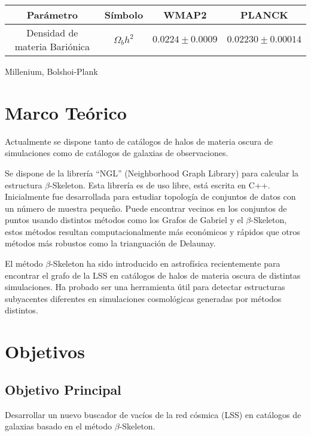 \documentclass[preprint]{aastex62}
\begin{document}
\begin{table}[htb]
    \begin{tabular}{|cc|cc| }
      \hline
      Parámetro & Símbolo & WMAP2 & PLANCK  \\
      \hline
      Densidad de materia Bariónica & $\Omega_b h^2$ & $0.0224 \pm 0.0009$ & $0.02230\pm 0.00014$ \\
      

      \hline
    \end{tabular}
  \end{table}
  
  
  Millenium, Bolshoi-Plank

  \section{Marco Teórico}

  Actualmente se dispone tanto de catálogos de halos de materia oscura de simulaciones como de catálogos de galaxias de observaciones.

  Se dispone de la librería ``NGL''\citep{ngl} (Neighborhood Graph Library)
  para calcular la estructura $\beta$-Skeleton. Esta librería es de uso libre, está escrita en C++.
  Inicialmente fue desarrollada para estudiar topología de conjuntos de datos con un número de muestra
  pequeño. Puede encontrar vecinos en los conjuntos de puntos usando distintos métodos como los
  Grafos de Gabriel y el $\beta$-Skeleton, estos métodos resultan computacionalmente más económicos
  y rápidos que otros métodos más robustos como la trianguación de Delaunay.

  El método $\beta$-Skeleton ha sido introducido en astrofísica recientemente \citep{Fang2018} para
  encontrar el grafo de la LSS en catálogos de halos de materia oscura de distintas simulaciones.
  Ha probado ser una herramienta útil para detectar estructuras subyacentes diferentes en
  simulaciones cosmológicas generadas por métodos distintos.
  

  \section{Objetivos}

  \subsection{Objetivo Principal}
  Desarrollar un nuevo buscador de vacíos de la red cósmica (LSS) en catálogos de galaxias
  basado en el método $\beta$-Skeleton.
  
\end{document}
